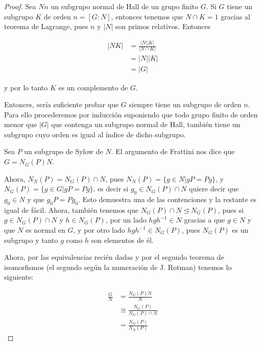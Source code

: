 \begin{proof}
    Sea $Nn$ un subgrupo normal de Hall de un grupo finito $G$. Si $G$ tiene un subgrupo $K$ de orden $n = [G:N]$, entonces
    tenemos que $N \cap K = 1$ gracias al teorema de Lagrange, pues $n$ y $|N|$ son primos relativos. Entonces
    
    \begin{align}
        |NK|    &= \frac{|N||K|}{|N \cap K|}    \\
                &= |N||K|                       \\
                &= |G| 
    \end{align}
    
    y por lo tanto $K$ es un complemento de $G$.\par\null
    
    Entonces, sería suficiente probar que $G$ siempre tiene un subgrupo de orden $n$. Para ello procederemos por inducción
    suponiendo que todo grupo finito de orden menor que $|G|$ que contenga un subgrupo normal de Hall, también
    tiene un subgrupo cuyo orden es igual al índice de dicho subgrupo.\par\null
    
    Sea $P$ un subgrupo de Sylow de $N$. El argumento de Frattini nos dice que $G = N_G(P)N$.\par\null
    
    Ahora, $N_N(P) = N_G(P) \cap N$, pues $N_N(P) = \{ g\in N | gP = Pg \}$, y $N_G(P) = \{ g\in G | gP = Pg \}$. es decir
    si $g_0 \in N_G(P) \cap N$ quiere decir que $g_0 \in N$ y que $g_0P = Pg_0$. Esto demuestra una de las contenciones y la
    restante es igual de fácil. Ahora,  también tenemos que $N_G(P) \cap N \trianglelefteq N_G(P)$, pues si $g \in N_G(P) \cap N$ y
    $h \in N_G(P)$, por un lado $hgh^{-1} \in N$ gracias a que $g \in N$ y que $N$ es normal en $G$, y por otro lado 
    $hgh^{-1} \in N_G(P)$, pues $N_G(P)$ es un subgrupo y tanto $g$ como $h$ son elementos de él.\par\null
    
    Ahora, por las equivalencias recién dadas y por el segundo teorema de isomorfismos 
    (el segundo según la numeración de J. Rotman) tenemos lo siguiente:
    
    \begin{align}
            \frac{G}{N}     &=      \frac{N_G(P)N}{N}               \\
                            &\cong  \frac{N_G(P)}{N_G(P) \cap N}    \\
                            &=      \frac{N_G(P)}{N_N(P)}
    \end{align}
\end{proof}